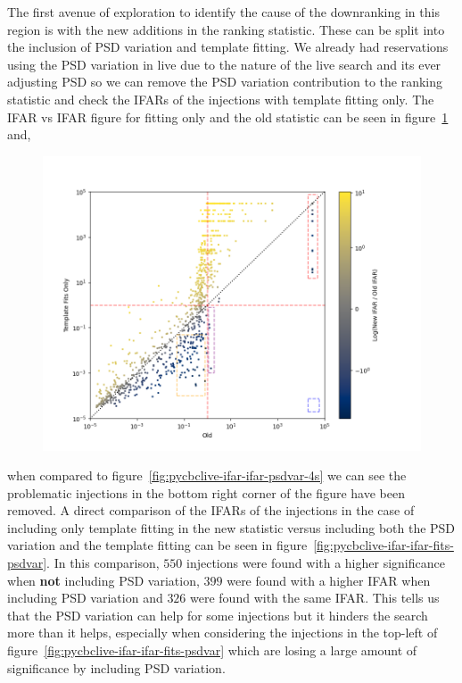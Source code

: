 The first avenue of exploration to identify the cause of the downranking in this region is with the new additions in the ranking statistic. These can be split into the inclusion of PSD variation and template fitting. We already had reservations using the PSD variation in live due to the nature of the live search and its ever adjusting PSD so we can remove the PSD variation contribution to the ranking statistic and check the IFARs of the injections with template fitting only. The IFAR vs IFAR figure for fitting only and the old statistic can be seen in figure~\ref{fig:pycbclive-ifar-ifar-fits-only-4s} and,
%
\begin{figure}
       \centering
    \includegraphics[width=1.2\textwidth]{images/pycbclive/fits_only_4s_ifar_vs_ifar_regions.png}
    \caption{}
    \label{fig:pycbclive-ifar-ifar-fits-only-4s}
\end{figure}
%
when compared to figure~\ref{fig:pycbclive-ifar-ifar-psdvar-4s} we can see the problematic injections in the bottom right corner of the figure have been removed. A direct comparison of the IFARs of the injections in the case of including only template fitting in the new statistic versus including both the PSD variation and the template fitting can be seen in figure~\ref{fig:pycbclive-ifar-ifar-fits-psdvar}. In this comparison, $550$ injections were found with a higher significance when \textbf{not} including PSD variation, $399$ were found with a higher IFAR when including PSD variation and $326$ were found with the same IFAR. This tells us that the PSD variation can help for some injections but it hinders the search more than it helps, especially when considering the injections in the top-left of figure~\ref{fig:pycbclive-ifar-ifar-fits-psdvar} which are losing a large amount of significance by including PSD variation.

